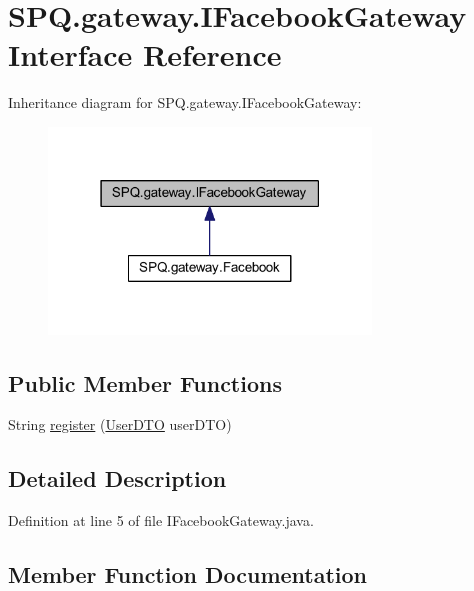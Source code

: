 \hypertarget{interface_s_p_q_1_1gateway_1_1_i_facebook_gateway}{}\section{S\+P\+Q.\+gateway.\+I\+Facebook\+Gateway Interface Reference}
\label{interface_s_p_q_1_1gateway_1_1_i_facebook_gateway}


Inheritance diagram for S\+P\+Q.\+gateway.\+I\+Facebook\+Gateway\+:\nopagebreak
\begin{figure}[H]
\begin{center}
\leavevmode
\includegraphics[width=243pt]{interface_s_p_q_1_1gateway_1_1_i_facebook_gateway__inherit__graph}
\end{center}
\end{figure}
\subsection*{Public Member Functions}
\begin{DoxyCompactItemize}
\item 
String \mbox{\hyperlink{interface_s_p_q_1_1gateway_1_1_i_facebook_gateway_adeef42315d68dc80ddf79bf4e1cbdeb0}{register}} (\mbox{\hyperlink{class_s_p_q_1_1dto_1_1_user_d_t_o}{User\+D\+TO}} user\+D\+TO)
\end{DoxyCompactItemize}


\subsection{Detailed Description}


Definition at line 5 of file I\+Facebook\+Gateway.\+java.



\subsection{Member Function Documentation}
\mbox{\label{interface_s_p_q_1_1gateway_1_1_i_facebook_gateway_adeef42315d68dc80ddf79bf4e1cbdeb0}} 

